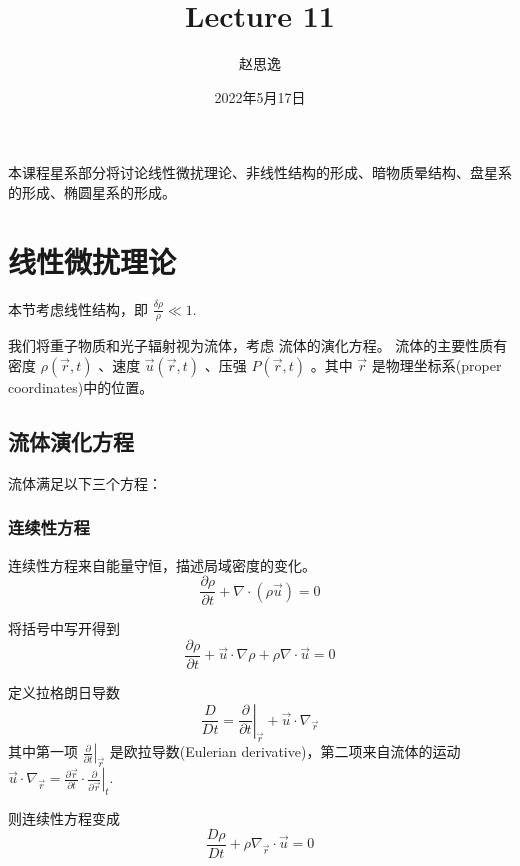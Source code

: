 \documentclass[12pt]{ctexart}
\title{Lecture 11}
\author{赵思逸}
\date{2022年5月17日}
\begin{document}
\maketitle

本课程星系部分将讨论线性微扰理论、非线性结构的形成、暗物质晕结构、盘星系的形成、椭圆星系的形成。

\section{线性微扰理论}

本节考虑线性结构，即 $\frac{\delta \rho}{\rho} \ll 1$.

我们将重子物质和光子辐射视为流体，考虑
流体的演化方程。
流体的主要性质有 密度 $\rho\left(\vec{r},t\right) $ 、速度 $\vec{u}\left(\vec{r},t\right) $ 、压强 $P\left(\vec{r},t\right) $   。其中 $\vec{r}$ 是物理坐标系(proper coordinates)中的位置。

\subsection{流体演化方程}
流体满足以下三个方程： 

\subsubsection*{连续性方程}

连续性方程来自能量守恒，描述局域密度的变化。
\begin{equation}
    \frac{\partial \rho}{\partial t} + \nabla \cdot \left(\rho \vec{u}\right) = 0
\end{equation}

将括号中写开得到
\begin{equation}
    \frac{\partial \rho}{\partial t} + \vec{u}\cdot \nabla \rho + \rho \nabla \cdot \vec{u} = 0
\end{equation}

定义拉格朗日导数
\begin{equation}
    \frac{D}{D t} = \left.\frac{\partial}{\partial t} \right|_{\vec{r}} + \vec{u}\cdot \nabla_{\vec{r}}
\end{equation}
其中第一项 $\left.\frac{\partial}{\partial t} \right|_{\vec{r}}$ 是欧拉导数(Eulerian derivative)，第二项来自流体的运动 $\vec{u}\cdot \nabla_{\vec{r}} = \frac{\partial \vec{r}}{\partial t} \cdot \left.\frac{\partial}{\partial \vec{r}}\right|_t$.

则连续性方程变成
\begin{equation} \label{eq:continu}
    \frac{D \rho}{D t} + \rho \nabla_{\vec{r}} \cdot \vec{u} = 0
\end{equation}
\end{document}
